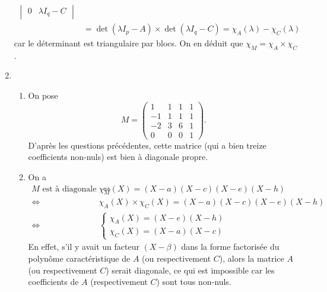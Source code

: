 \documentclass[a4paper]{article}
\begin{document}
\begin{enumerate}
\begin{align*}
\begin{vmatrix}
					0 & \lambda I_q - C
				\end{vmatrix}\\
				&= \det(\lambda I_p - A) \times \det(\lambda I_q - C) = \chi_A(\lambda) - \chi_C(\lambda)
			\end{align*}
			car le déterminant est triangulaire par blocs. On en déduit que $\chi_M = \chi_A \times \chi_C$.
		\item
			\begin{enumerate}
				\item On pose \[
						M = \left(\begin{array}{ccc|c}
							1&1&1&1\\
							-1&1&1&1\\
							-2&3&6&1\\ \hline
							0&0&0&1
						\end{array}\right)
					.\] D'après les questions précédentes, cette matrice (qui a bien treize coefficients non-nuls) est bien à diagonale propre.
				\item On a
					\begin{align*}
						M \text{ est à diagonale propre } \iff& \chi_M(X) = (X-a)(X-c)(X-e)(X-h)\\
						\iff& \chi_A(X) \times \chi_C(X) = (X-a)(X-c)(X-e)(X-h)\\
						\iff& \begin{cases}
							\chi_A(X) = (X-e)(X-h)\\
							\chi_C(X) = (X-a)(X-c)
						\end{cases}
					\end{align*}
					En effet, s'il y avait un facteur $(X-\beta)$\/ dans la forme factorisée du polynôme caractéristique de $A$\/ (ou respectivement $C$), alors la matrice $A$\/ (ou respectivement $C$) serait diagonale, ce qui est impossible car les coefficients de $A$\/ (respectivement $C$) sont tous non-nuls.


\end{enumerate}
\end{enumerate}
\end{document}
